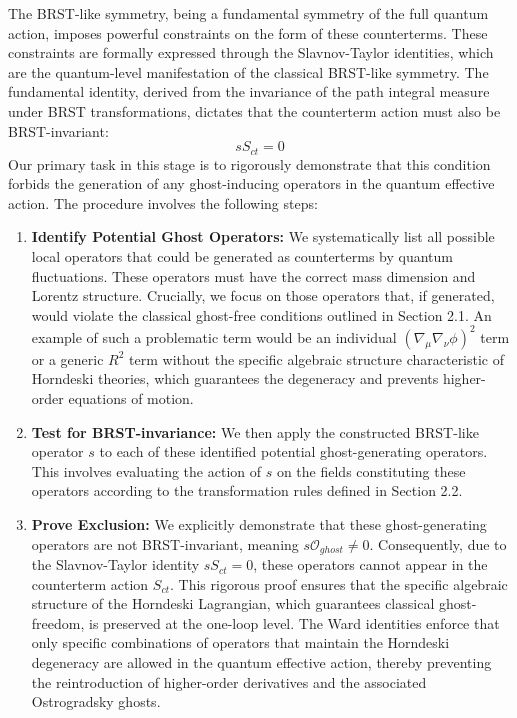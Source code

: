 \documentclass[twocolumn]{aastex631}
\begin{document}
The BRST-like symmetry, being a fundamental symmetry of the full quantum action, imposes powerful constraints on the form of these counterterms. These constraints are formally expressed through the Slavnov-Taylor identities, which are the quantum-level manifestation of the classical BRST-like symmetry. The fundamental identity, derived from the invariance of the path integral measure under BRST transformations, dictates that the counterterm action must also be BRST-invariant:
$$s S_{ct} = 0$$
Our primary task in this stage is to rigorously demonstrate that this condition forbids the generation of any ghost-inducing operators in the quantum effective action. The procedure involves the following steps:
\begin{enumerate}
    \item \textbf{Identify Potential Ghost Operators:} We systematically list all possible local operators that could be generated as counterterms by quantum fluctuations. These operators must have the correct mass dimension and Lorentz structure. Crucially, we focus on those operators that, if generated, would violate the classical ghost-free conditions outlined in Section 2.1. An example of such a problematic term would be an individual $(\nabla_\mu \nabla_\nu \phi)^2$ term or a generic $R^2$ term without the specific algebraic structure characteristic of Horndeski theories, which guarantees the degeneracy and prevents higher-order equations of motion.
    \item \textbf{Test for BRST-invariance:} We then apply the constructed BRST-like operator $s$ to each of these identified potential ghost-generating operators. This involves evaluating the action of $s$ on the fields constituting these operators according to the transformation rules defined in Section 2.2.
    \item \textbf{Prove Exclusion:} We explicitly demonstrate that these ghost-generating operators are not BRST-invariant, meaning $s \mathcal{O}_{ghost} \neq 0$. Consequently, due to the Slavnov-Taylor identity $s S_{ct} = 0$, these operators cannot appear in the counterterm action $S_{ct}$. This rigorous proof ensures that the specific algebraic structure of the Horndeski Lagrangian, which guarantees classical ghost-freedom, is preserved at the one-loop level. The Ward identities enforce that only specific combinations of operators that maintain the Horndeski degeneracy are allowed in the quantum effective action, thereby preventing the reintroduction of higher-order derivatives and the associated Ostrogradsky ghosts.

\end{enumerate}
\end{document}
